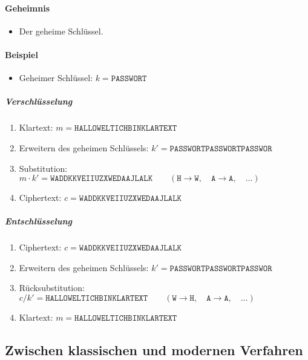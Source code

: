 			\paragraph{Geheimnis}
				\begin{itemize}
					\item Der geheime Schlüssel.
				\end{itemize}

			\paragraph{Beispiel}
				\begin{itemize}
					\item Geheimer Schlüssel: \( k = \texttt{PASSWORT} \)
				\end{itemize}

				\subparagraph{Verschlüsselung}
					\begin{enumerate}
						\item[] Klartext: \( m = \texttt{HALLOWELTICHBINKLARTEXT} \)
						\item Erweitern des geheimen Schlüssels: \( k' = \texttt{PASSWORTPASSWORTPASSWOR} \)
						\item Substitution: \( m \cdot k' = \texttt{WADDKKVEIIUZXWEDAAJLALK} \qquad(\texttt{H} \rightarrow \texttt{W}, \quad\texttt{A} \rightarrow \texttt{A}, \quad\dots) \)
						\item[] Ciphertext: \( c = \texttt{WADDKKVEIIUZXWEDAAJLALK} \)
					\end{enumerate}

				\subparagraph{Entschlüsselung}
					\begin{enumerate}
						\item[] Ciphertext: \( c = \texttt{WADDKKVEIIUZXWEDAAJLALK} \)
						\item Erweitern des geheimen Schlüssels: \( k' = \texttt{PASSWORTPASSWORTPASSWOR} \)
						\item Rücksubstitution: \( c / k' = \texttt{HALLOWELTICHBINKLARTEXT} \qquad(\texttt{W} \rightarrow \texttt{H}, \quad\texttt{A} \rightarrow \texttt{A}, \quad\dots) \)
						\item[] Klartext: \( m = \texttt{HALLOWELTICHBINKLARTEXT} \)
					\end{enumerate}

	\subsection{Zwischen klassischen und modernen Verfahren}

